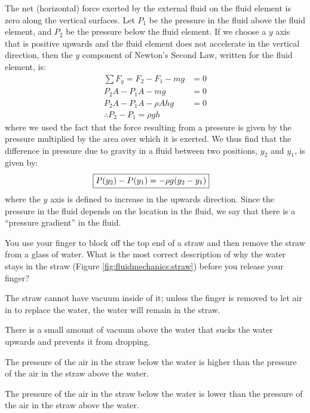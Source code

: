 The net (horizontal) force exerted by the external fluid on the fluid element is zero along the vertical surfaces. Let $P_1$ be the pressure in the fluid above the fluid element, and $P_2$ be the pressure below the fluid element. If we choose a $y$ axis that is positive upwards and the fluid element does not accelerate in the vertical direction, then the $y$ component of Newton's Second Law, written for the fluid element, is:
\begin{align*}
\sum F_y = F_2 - F_1 -mg &= 0\\
P_2A - P_1A-mg &=0\\
P_2A - P_1A-\rho Ahg &=0\\
\therefore P_2 - P_1 = \rho gh
\end{align*}
where we used the fact that the force resulting from a pressure is given by the pressure multiplied by the area over which it is exerted. We thus find that the difference in pressure due to gravity in a fluid between two positions, $y_2$ and $y_1$, is given by:
\begin{align}
\label{eq:fluidmechanics:pgrav}
\Aboxed{P(y_2) - P(y_1) = -\rho g (y_2 - y_1)}
\end{align}
where the $y$ axis is defined to increase in the upwards direction. Since the pressure in the fluid depends on the location in the fluid, we say that there is a ``pressure gradient'' in the fluid.
\newpage
\begin{checkpoint}
\begin{MCquestion}{You use your finger to block off the top end of a straw and then remove the straw from a glass of water. What is the most correct description of why the water stays in the straw (Figure \ref{fig:fluidmechanics:straw}) before you release your finger?}
\item The straw cannot have vacuum inside of it; unless the finger is removed to let air in to replace the water, the water will remain in the straw.
\item There is a small amount of vacuum above the water that sucks the water upwards and prevents it from dropping. 
\item The pressure of the air in the straw below the water is higher than the pressure of the air in the straw above the water. \correct
\item The pressure of the air in the straw below the water is lower than the pressure of the air in the straw above the water.
\end{MCquestion}
\end{checkpoint}

